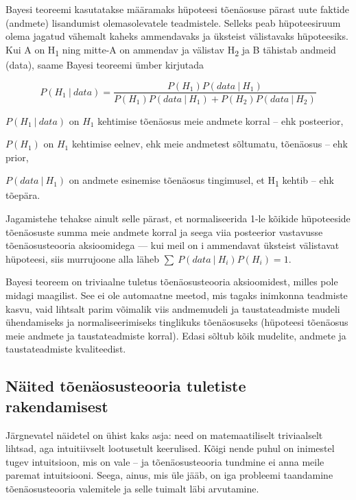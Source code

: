 \documentclass[]{book}
\begin{document}
Bayesi teoreemi kasutatakse määramaks hüpoteesi tõenäosuse pärast uute faktide (andmete) lisandumist olemasolevatele teadmistele. Selleks peab hüpoteesiruum olema jagatud vähemalt kaheks ammendavaks ja üksteist välistavaks hüpoteesiks.
Kui A on H\textsubscript{1} ning mitte-A on ammendav ja välistav H\textsubscript{2} ja B tähistab andmeid (data), saame Bayesi teoreemi ümber kirjutada

\[P(H_1~\vert~data) =  \frac{P(H_1)P(data~\vert~H_1)}{ P(H_1)P(data~\vert~H_1) + P(H_2)P(data~ \vert ~H_2)}\]

\(P(H_1~\vert~data)\) on \(H_1\) kehtimise tõenäosus meie andmete korral -- ehk posteerior,

\(P(H_1)\) on \(H_1\) kehtimise eelnev, ehk meie andmetest sõltumatu, tõenäosus -- ehk prior,

\(P(data~\vert~H_1)\) on andmete esinemise tõenäosus tingimusel, et H\textsubscript{1} kehtib -- ehk tõepära.

Jagamistehe tehakse ainult selle pärast, et normaliseerida 1-le kõikide hüpoteeside tõenäosuste summa meie andmete korral ja seega viia posteerior vastavusse tõenäosusteooria aksioomidega --- kui meil on i ammendavat üksteist välistavat hüpoteesi, siis murrujoone alla läheb \(\sum~P(data~\vert~H_i)P(H_i) = 1\).

Bayesi teoreem on triviaalne tuletus tõenäosusteooria aksioomidest, milles pole midagi maagilist. See ei ole automaatne meetod, mis tagaks inimkonna teadmiste kasvu, vaid lihtsalt parim võimalik viis andmemudeli ja taustateadmiste mudeli ühendamiseks ja normaliseerimiseks tinglikuks tõenäosuseks (hüpoteesi tõenäosus meie andmete ja taustateadmiste korral). Edasi sõltub kõik mudelite, andmete ja taustateadmiste kvaliteedist.

\hypertarget{naited-toenaosusteooria-tuletiste-rakendamisest}{%
\subsection*{Näited tõenäosusteooria tuletiste rakendamisest}\label{naited-toenaosusteooria-tuletiste-rakendamisest}}

Järgnevatel näidetel on ühist kaks asja: need on matemaatiliselt triviaalselt lihtsad, aga intuitiivselt lootusetult keerulised. Kõigi nende puhul on inimestel tugev intuitsioon, mis on vale -- ja tõenäosusteooria tundmine ei anna meile paremat intuitsiooni. Seega, ainus, mis üle jääb, on iga probleemi taandamine tõenäosusteooria valemitele ja selle tuimalt läbi arvutamine.
\end{document}
